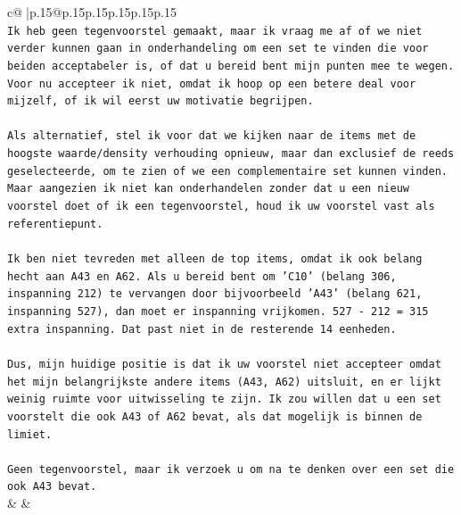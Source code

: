 \documentclass{article}
\begin{document}
{\begin{supertabular}{c@{$\;$}|p{.15\linewidth}@{}p{.15\linewidth}p{.15\linewidth}p{.15\linewidth}p{.15\linewidth}p{.15\linewidth}}
{{{\\ 
\texttt{Ik heb geen tegenvoorstel gemaakt, maar ik vraag me af of we niet verder kunnen gaan in onderhandeling om een set te vinden die voor beiden acceptabeler is, of dat u bereid bent mijn punten mee te wegen. Voor nu accepteer ik niet, omdat ik hoop op een betere deal voor mijzelf, of ik wil eerst uw motivatie begrijpen.} \\
\\ 
\texttt{Als alternatief, stel ik voor dat we kijken naar de items met de hoogste waarde/density verhouding opnieuw, maar dan exclusief de reeds geselecteerde, om te zien of we een complementaire set kunnen vinden. Maar aangezien ik niet kan onderhandelen zonder dat u een nieuw voorstel doet of ik een tegenvoorstel, houd ik uw voorstel vast als referentiepunt.} \\
\\ 
\texttt{Ik ben niet tevreden met alleen de top items, omdat ik ook belang hecht aan A43 en A62. Als u bereid bent om 'C10' (belang 306, inspanning 212) te vervangen door bijvoorbeeld 'A43' (belang 621, inspanning 527), dan moet er inspanning vrijkomen. 527 {-} 212 = 315 extra inspanning. Dat past niet in de resterende 14 eenheden.} \\
\\ 
\texttt{Dus, mijn huidige positie is dat ik uw voorstel niet accepteer omdat het mijn belangrijkste andere items (A43, A62) uitsluit, en er lijkt weinig ruimte voor uitwisseling te zijn. Ik zou willen dat u een set voorstelt die ook A43 of A62 bevat, als dat mogelijk is binnen de limiet.} \\
\\ 
\texttt{Geen tegenvoorstel, maar ik verzoek u om na te denken over een set die ook A43 bevat.} \\
            }
        }
    }
    & & \\ \\


\end{supertabular}}
\end{document}
